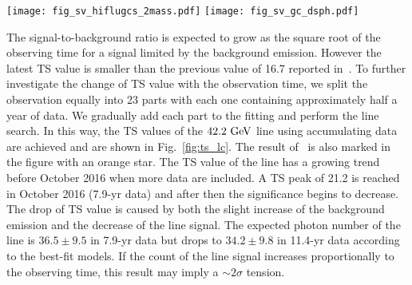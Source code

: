 \documentclass[
	twocolumn,
]{aastex6} %
\newcommand{\grs}{$\gamma$ rays\xspace}
\begin{document}
\begin{figure*}
	\centering
	\texttt{[image: fig\_sv\_hiflugcs\_2mass.pdf]}
	\texttt{[image: fig\_sv\_gc\_dsph.pdf]}
    \caption{\label{fig:sv}
		The 95\% confidence level upper limit on the thermally averaged DM annihilation cross section into double \grs.
		The left panel shows the constraints from the Galaxy clusters.
		The blue solid line and orange dashed line represent the results derived with the baseline GCl sample and 2MASS GCl sample respectively.
		The pink dot-dashed and purple dotted lines are the GCl constraints from~\citet{Liang2016} and~\citet{QuincyAdams2016} respectively.
		Yellow and green band show the 68\% and 95\% containment of limits.
		The right panel shows the constraints from the Galaxy center (isothermal profile)~\citep{Ackermann2015}, dwarf galaxies (B15 sample)~\citep{Liang2016b} and the subhalo population~\citep{Liang2017}.
	}
\end{figure*}

The signal-to-background ratio is expected to grow as the square root of the observing time for a signal limited by the background emission.
However the latest TS value is smaller than the previous value of 16.7 reported in~\citet{Liang2016}.
To further investigate the change of TS value with the observation time, we split the observation equally into 23 parts with each one containing approximately half a year of data.
We gradually add each part to the fitting and perform the line search.
In this way, the TS values of the $42.2~\rm GeV$ line using accumulating data are achieved and are shown in Fig.~\ref{fig:ts_lc}.
The result of~\citet{Liang2016} is also marked in the figure with an orange star.
The TS value of the line has a growing trend before October 2016 when more data are included.
A TS peak of 21.2 is reached in October 2016 (7.9-yr data) and after then the significance begins to decrease.
The drop of TS value is caused by both the slight increase of the background emission and the decrease of the line signal.
The expected photon number of the line is $36.5\pm9.5$ in 7.9-yr data but drops to $34.2\pm9.8$ in 11.4-yr data according to the best-fit models.
If the count of the line signal increases proportionally to the observing time, this result may imply a $\sim 2\sigma$ tension.
\end{document}
